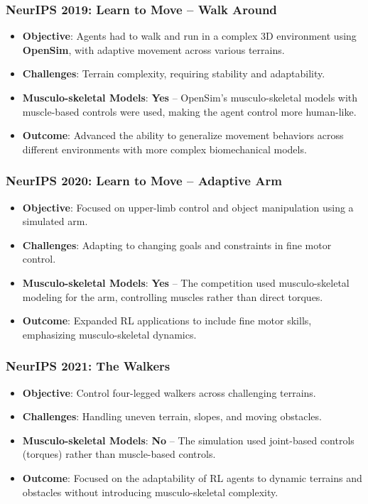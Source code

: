 \documentclass[12pt,a4paper]{article}
\begin{document}
\subsubsection{NeurIPS 2019: Learn to Move – Walk Around}

\begin{itemize}
    \item \textbf{Objective}: Agents had to walk and run in a complex 3D environment using
        \textbf{OpenSim}, with adaptive movement across various terrains.
    \item \textbf{Challenges}: Terrain complexity, requiring stability and adaptability.
    \item \textbf{Musculo-skeletal Models}: \textbf{Yes} – OpenSim's musculo-skeletal models with
        muscle-based controls were used, making the agent control more human-like.
    \item \textbf{Outcome}: Advanced the ability to generalize movement behaviors across different
        environments with more complex biomechanical models.
\end{itemize}

\subsubsection{NeurIPS 2020: Learn to Move – Adaptive Arm}

\begin{itemize}
    \item \textbf{Objective}: Focused on upper-limb control and object manipulation using a
        simulated arm.
    \item \textbf{Challenges}: Adapting to changing goals and constraints in fine motor control.
    \item \textbf{Musculo-skeletal Models}: \textbf{Yes} – The competition used musculo-skeletal
        modeling for the arm, controlling muscles rather than direct torques.
    \item \textbf{Outcome}: Expanded RL applications to include fine motor skills, emphasizing
        musculo-skeletal dynamics.
\end{itemize}

\subsubsection{NeurIPS 2021: The Walkers}

\begin{itemize}
    \item \textbf{Objective}: Control four-legged walkers across challenging terrains.
    \item \textbf{Challenges}: Handling uneven terrain, slopes, and moving obstacles.
    \item \textbf{Musculo-skeletal Models}: \textbf{No} – The simulation used joint-based controls
        (torques) rather than muscle-based controls.
    \item \textbf{Outcome}: Focused on the adaptability of RL agents to dynamic terrains and
        obstacles without introducing musculo-skeletal complexity.
\end{itemize}
\end{document}
